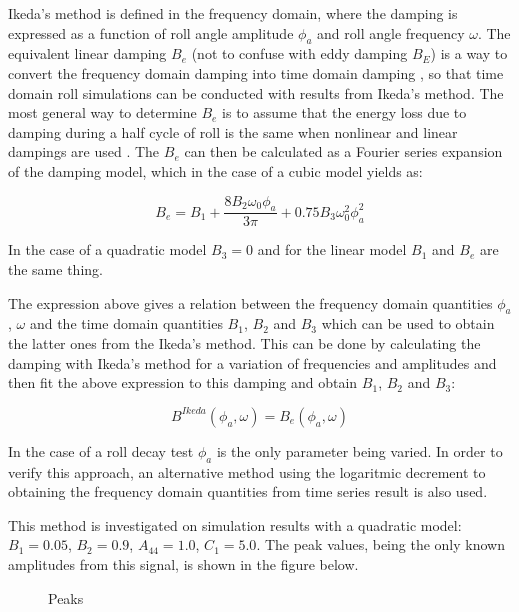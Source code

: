  \label{se:time_and_frequency} Ikeda's method is defined in the
frequency domain, where the damping is expressed as a function of roll
angle amplitude $\phi_a$ and roll angle frequency $\omega$. The
equivalent linear damping $B_e$ (not to confuse with eddy damping
$B_E$) is a way to convert the frequency domain damping into time
domain damping \cite{7505983/FB64RGPF}, so that time domain roll
simulations can be conducted with results from Ikeda's method. The most
general way to determine $B_e$ is to assume that the energy loss due
to damping during a half cycle of roll is the same when nonlinear and
linear dampings are used \cite{7505983/RYUBZITQ}. The $B_e$ can then
be calculated as a Fourier series expansion of the damping model, which
in the case of a cubic model yields as:
 
            
    
    \begin{equation}
B_{e} = B_{1} + \frac{8 B_{2} \omega_{0} \phi_{a}}{3 \pi} + 0.75 B_{3} \omega_{0}^{2} \phi_{a}^{2}
\label{eq:equation}
\end{equation}

    

    In the case of a quadratic model $B_3=0$ and for the linear model
$B_1$ and $B_e$ are the same thing.

    The expression above gives a relation between the frequency domain
quantities $\phi_a$, $\omega$ and the time domain quantities
$B_1$, $B_2$ and $B_3$ which can be used to obtain the latter ones
from the Ikeda's method. This can be done by calculating the damping
with Ikeda's method for a variation of frequencies and amplitudes and
then fit the above expression to this damping and obtain $B_1$,
$B_2$ and $B_3$:

\[B^{Ikeda}(\phi_a, \omega) = B_e(\phi_a, \omega)\]

In the case of a roll decay test $\phi_a$ is the only parameter being
varied. In order to verify this approach, an alternative method using
the logaritmic decrement \cite{7505983/BYNJ8CFG} to obtaining the
frequency domain quantities from time series result is also used.

This method is investigated on simulation results with a quadratic
model: $B_1 = 0.05$, $B_2 = 0.9$, $A_{44} = 1.0$, $C_1 = 5.0$.
The peak values, being the only known amplitudes from this signal, is
shown in the figure below.

    \begin{figure}
        \begin{center}\end{center}
        \caption{Peaks}
        \label{fig:peaks}
    \end{figure}
    
